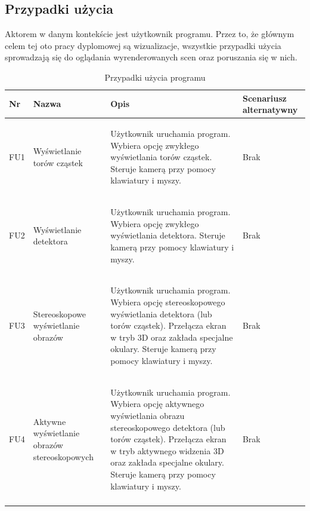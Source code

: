 \subsection{Przypadki użycia}
Aktorem w danym kontekście jest użytkownik programu. Przez to, że głównym celem tej oto pracy dyplomowej są wizualizacje, wszystkie przypadki użycia sprowadzają się do oglądania wyrenderowanych scen oraz poruszania się w nich.
\begin{table}[H]
\caption{Przypadki użycia programu}
\centering
\footnotesize
\label{tab4}
\begin{tabular}{!{\color{sapphire}\vrule width 1pt}m{0.05\textwidth}!{\color{black}\vrule width 1pt}m{0.16\textwidth}!{\color{black}\vrule width 1pt}m{0.50\textwidth}!{\color{black}\vrule width 1pt}m{0.17\textwidth}!{\color{sapphire}\vrule width 1pt}}
	\hline
	\Centering\bfseries Nr &
	\Centering\bfseries Nazwa &
	\Centering\bfseries Opis &
	\Centering\bfseries Scenariusz alternatywny \\
	\hline
	FU1 & Wyświetlanie torów cząstek & 
	\begin{itemize}
	\itemi Użytkownik uruchamia program.
	\itemi Wybiera opcję zwykłego wyświetlania torów cząstek.
	\itemi Steruje kamerą przy pomocy klawiatury i myszy.
	\end{itemize} & Brak \\ 
	\hline
	FU2 & Wyświetlanie detektora & \begin{itemize}
	\itemi Użytkownik uruchamia program.
	\itemi Wybiera opcję zwykłego wyświetlania detektora.
	\itemi Steruje kamerą przy pomocy klawiatury i myszy.
	\end{itemize} & Brak \\ 
	\hline
	FU3 & Stereoskopowe wyświetlanie obrazów & \begin{itemize}
	\itemi Użytkownik uruchamia program.
	\itemi Wybiera opcję stereoskopowego wyświetlania detektora (lub torów cząstek).
	\itemi Przełącza ekran w tryb 3D oraz zakłada specjalne okulary.
	\itemi Steruje kamerą przy pomocy klawiatury i myszy.
	\end{itemize} & Brak \\ 
	\hline
	FU4 & Aktywne wyświetlanie obrazów stereoskopowych & \begin{itemize}
	\itemi Użytkownik uruchamia program.
	\itemi Wybiera opcję aktywnego wyświetlania obrazu stereoskopowego detektora (lub torów cząstek).
	\itemi Przełącza ekran w tryb aktywnego widzenia 3D oraz zakłada specjalne okulary.
	\itemi Steruje kamerą przy pomocy klawiatury i myszy.
	\end{itemize} & Brak \\ 
	\hline
\end{tabular}
\end{table}

